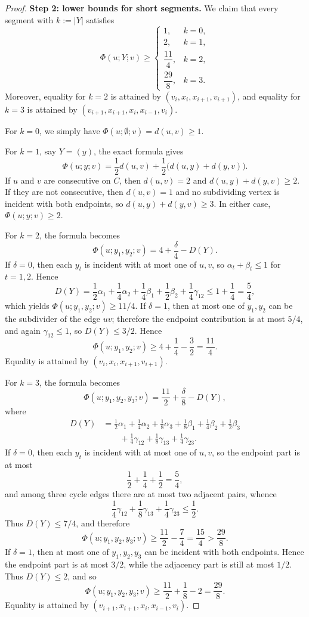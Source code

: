 \documentclass[11pt]{amsart}
\begin{document}
\begin{proof}
\medskip
\noindent\textbf{Step 2: lower bounds for short segments.}
We claim that every segment with $k:=|Y|$ satisfies
\[
\Phi(u;Y;v)\ge
\begin{cases}
1, & k=0,\\[1mm]
2, & k=1,\\[1mm]
\dfrac{11}{4}, & k=2,\\[2mm]
\dfrac{29}{8}, & k=3.
\end{cases}
\]
Moreover, equality for $k=2$ is attained by $(v_i,x_i,x_{i+1},v_{i+1})$, and equality for $k=3$ is attained by $(v_{i+1},x_{i+1},x_i,x_{i-1},v_i)$.

For $k=0$, we simply have $\Phi(u;\emptyset;v)=d(u,v)\ge 1$.

For $k=1$, say $Y=(y)$, the exact formula gives
\[
\Phi(u;y;v)=\frac12 d(u,v)+\frac12\bigl(d(u,y)+d(y,v)\bigr).
\]
If $u$ and $v$ are consecutive on $C$, then $d(u,v)=2$ and $d(u,y)+d(y,v)\ge 2$. If they are not consecutive, then $d(u,v)=1$ and no subdividing vertex is incident with both endpoints, so $d(u,y)+d(y,v)\ge 3$. In either case, $\Phi(u;y;v)\ge 2$.

For $k=2$, the formula becomes
\[
\Phi(u;y_1,y_2;v)=4+\frac\delta4-D(Y).
\]
If $\delta=0$, then each $y_t$ is incident with at most one of $u,v$, so $\alpha_t+\beta_t\le 1$ for $t=1,2$. Hence
\[
D(Y)
=\frac12\alpha_1+\frac14\alpha_2+\frac14\beta_1+\frac12\beta_2+\frac14\gamma_{12}
\le 1+\frac14=\frac54,
\]
which yields $\Phi(u;y_1,y_2;v)\ge 11/4$. If $\delta=1$, then at most one of $y_1,y_2$ can be the subdivider of the edge $uv$; therefore the endpoint contribution is at most $5/4$, and again $\gamma_{12}\le 1$, so $D(Y)\le 3/2$. Hence
\[
\Phi(u;y_1,y_2;v)\ge 4+\frac14-\frac32=\frac{11}{4}.
\]
Equality is attained by $(v_i,x_i,x_{i+1},v_{i+1})$.

For $k=3$, the formula becomes
\[
\Phi(u;y_1,y_2,y_3;v)=\frac{11}{2}+\frac\delta8-D(Y),
\]
where
\begin{align*}
D(Y)
&=\frac12\alpha_1+\frac14\alpha_2+\frac18\alpha_3
+\frac18\beta_1+\frac14\beta_2+\frac12\beta_3 \\
&\qquad +\frac14\gamma_{12}+\frac18\gamma_{13}+\frac14\gamma_{23}.
\end{align*}
If $\delta=0$, then each $y_t$ is incident with at most one of $u,v$, so the endpoint part is at most
\[
\frac12+\frac14+\frac12=\frac54,
\]
and among three cycle edges there are at most two adjacent pairs, whence
\[
\frac14\gamma_{12}+\frac18\gamma_{13}+\frac14\gamma_{23}\le \frac12.
\]
Thus $D(Y)\le 7/4$, and therefore
\[
\Phi(u;y_1,y_2,y_3;v)\ge \frac{11}{2}-\frac74=\frac{15}{4}>\frac{29}{8}.
\]
If $\delta=1$, then at most one of $y_1,y_2,y_3$ can be incident with both endpoints. Hence the endpoint part is at most $3/2$, while the adjacency part is still at most $1/2$. Thus $D(Y)\le 2$, and so
\[
\Phi(u;y_1,y_2,y_3;v)\ge \frac{11}{2}+\frac18-2=\frac{29}{8}.
\]
Equality is attained by $(v_{i+1},x_{i+1},x_i,x_{i-1},v_i)$.


\end{proof}
\end{document}
